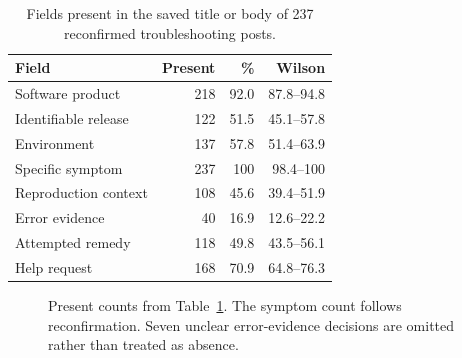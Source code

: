 \documentclass[conference,letterpaper]{IEEEtran}
\begin{document}
\begin{table}[t]
\caption{Fields present in the saved title or body of 237 reconfirmed troubleshooting posts.}
\label{tab:fields}
\centering
\footnotesize
\setlength{\tabcolsep}{3pt}
\begin{tabular}{lrrr}
\toprule
Field & Present & \% & Wilson \\
\midrule
Software product & 218 & 92.0 & 87.8--94.8 \\
Identifiable release & 122 & 51.5 & 45.1--57.8 \\
Environment & 137 & 57.8 & 51.4--63.9 \\
Specific symptom & 237 & 100 & 98.4--100 \\
Reproduction context & 108 & 45.6 & 39.4--51.9 \\
Error evidence & 40 & 16.9 & 12.6--22.2 \\
Attempted remedy & 118 & 49.8 & 43.5--56.1 \\
Help request & 168 & 70.9 & 64.8--76.3 \\
\bottomrule
\end{tabular}
\end{table}

\begin{figure}[t]
\centering
{}
\caption{Present counts from Table~\ref{tab:fields}. The symptom count follows reconfirmation. Seven unclear error-evidence decisions are omitted rather than treated as absence.}
\label{fig:fields}
\end{figure}
\end{document}
